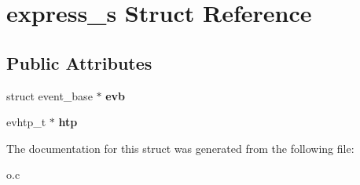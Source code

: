 \hypertarget{structexpress__s}{\section{express\-\_\-s Struct Reference}
\label{structexpress__s}
}
\subsection*{Public Attributes}
\begin{DoxyCompactItemize}
\item 
\hypertarget{structexpress__s_adbf9d3c297aa3318eda0c34e0f73a81d}{struct event\-\_\-base $\ast$ {\bfseries evb}}\label{structexpress__s_adbf9d3c297aa3318eda0c34e0f73a81d}

\item 
\hypertarget{structexpress__s_a9d2edb9a2868a27f3b07c0dd824e8868}{evhtp\-\_\-t $\ast$ {\bfseries htp}}\label{structexpress__s_a9d2edb9a2868a27f3b07c0dd824e8868}

\end{DoxyCompactItemize}


The documentation for this struct was generated from the following file\-:\begin{DoxyCompactItemize}
\item 
o.\-c\end{DoxyCompactItemize}

